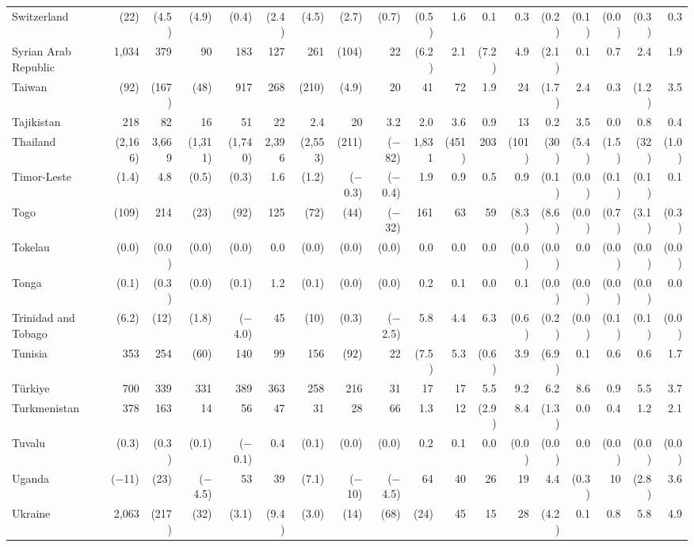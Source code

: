 \begin{longtable}{lrrrrrrrrrrrrrrrrr}
Switzerland & (22) & (4.5) & (4.9) & (0.4) & (2.4) & (4.5) & (2.7) & (0.7) & (0.5) & 1.6 & 0.1 & 0.3 & (0.2) & (0.1) & (0.0) & (0.3) & 0.3 \\
Syrian Arab Republic & 1,034 & 379 & 90 & 183 & 127 & 261 & (104) & 22 & (6.2) & 2.1 & (7.2) & 4.9 & (2.1) & 0.1 & 0.7 & 2.4 & 1.9 \\
Taiwan & (92) & (167) & (48) & 917 & 268 & (210) & (4.9) & 20 & 41 & 72 & 1.9 & 24 & (1.7) & 2.4 & 0.3 & (1.2) & 3.5 \\
Tajikistan & 218 & 82 & 16 & 51 & 22 & 2.4 & 20 & 3.2 & 2.0 & 3.6 & 0.9 & 13 & 0.2 & 3.5 & 0.0 & 0.8 & 0.4 \\
Thailand & (2,166) & 3,669 & (1,311) & (1,740) & 2,396 & (2,553) & (211) & ($-$82) & 1,831 & (451) & 203 & (101) & (30) & (5.4) & (1.5) & (32) & (1.0) \\
Timor-Leste & (1.4) & 4.8 & (0.5) & (0.3) & 1.6 & (1.2) & ($-$0.3) & ($-$0.4) & 1.9 & 0.9 & 0.5 & 0.9 & (0.1) & (0.0) & (0.1) & (0.1) & 0.1 \\
Togo & (109) & 214 & (23) & (92) & 125 & (72) & (44) & ($-$32) & 161 & 63 & 59 & (8.3) & (8.6) & (0.0) & (0.7) & (3.1) & (0.3) \\
Tokelau & (0.0) & (0.0) & (0.0) & (0.0) & 0.0 & (0.0) & (0.0) & (0.0) & 0.0 & 0.0 & 0.0 & (0.0) & (0.0) & 0.0 & (0.0) & (0.0) & (0.0) \\
Tonga & (0.1) & (0.3) & (0.0) & (0.1) & 1.2 & (0.1) & (0.0) & (0.0) & 0.2 & 0.1 & 0.0 & 0.1 & (0.0) & (0.0) & (0.0) & (0.0) & 0.0 \\
Trinidad and Tobago & (6.2) & (12) & (1.8) & ($-$4.0) & 45 & (10) & (0.3) & ($-$2.5) & 5.8 & 4.4 & 6.3 & (0.6) & (0.2) & (0.0) & (0.1) & (0.1) & (0.0) \\
Tunisia & 353 & 254 & (60) & 140 & 99 & 156 & (92) & 22 & (7.5) & 5.3 & (0.6) & 3.9 & (6.9) & 0.1 & 0.6 & 0.6 & 1.7 \\
Türkiye & 700 & 339 & 331 & 389 & 363 & 258 & 216 & 31 & 17 & 17 & 5.5 & 9.2 & 6.2 & 8.6 & 0.9 & 5.5 & 3.7 \\
Turkmenistan & 378 & 163 & 14 & 56 & 47 & 31 & 28 & 66 & 1.3 & 12 & (2.9) & 8.4 & (1.3) & 0.0 & 0.4 & 1.2 & 2.1 \\
Tuvalu & (0.3) & (0.3) & (0.1) & ($-$0.1) & 0.4 & (0.1) & (0.0) & (0.0) & 0.2 & 0.1 & 0.0 & (0.0) & (0.0) & 0.0 & (0.0) & (0.0) & (0.0) \\
Uganda & ($-$11) & (23) & ($-$4.5) & 53 & 39 & (7.1) & ($-$10) & ($-$4.5) & 64 & 40 & 26 & 19 & 4.4 & (0.3) & 10 & (2.8) & 3.6 \\
Ukraine & 2,063 & (217) & (32) & (3.1) & (9.4) & (3.0) & (14) & (68) & (24) & 45 & 15 & 28 & (4.2) & 0.1 & 0.8 & 5.8 & 4.9 \\

\end{longtable}
